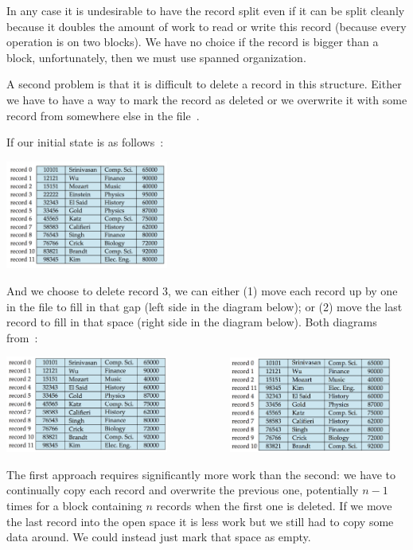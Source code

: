 In any case it is undesirable to have the record split even if it can be split cleanly because it doubles the amount of work to read or write this record (because every operation is on two blocks). We have no choice if the record is bigger than a block, unfortunately, then we must use spanned organization. 

A second problem is that it is difficult to delete a record in this structure. Either we have to have a way to mark the record as deleted or we overwrite it with some record from somewhere else in the file~\cite{dsc}.

If our initial state is as follows~\cite{dsc}:

\begin{center}
\includegraphics[width=0.4\textwidth]{images/instructor-1}
\end{center}

And we choose to delete record 3, we can either (1) move each record up by one in the file to fill in that gap (left side in the diagram below); or (2) move the last record to fill in that space (right side in the diagram below). Both diagrams from~\cite{dsc}:

\begin{center}
\includegraphics[width=0.4\textwidth]{images/instructor-2} 
~~~~~~~~~~
\includegraphics[width=0.4\textwidth]{images/instructor-3}
\end{center}

The first approach requires significantly more work than the second: we have to continually copy each record and overwrite the previous one, potentially $n-1$ times for a block containing $n$ records when the first one is deleted. If we move the last record into the open space it is less work but we still had to copy some data around. We could instead just mark that space as empty. 

